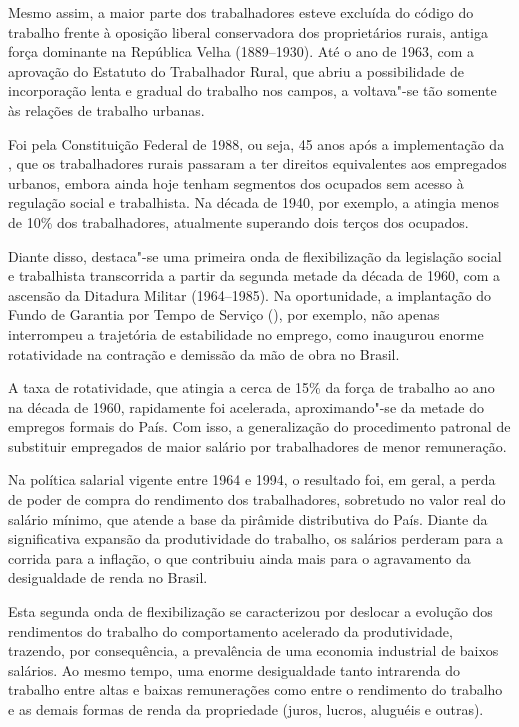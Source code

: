 Mesmo assim, a maior parte dos trabalhadores esteve excluída do código
do trabalho frente à oposição liberal conservadora dos proprietários
rurais, antiga força dominante na República Velha (1889--1930). Até o
ano de 1963, com a aprovação do Estatuto do Trabalhador Rural, que abriu
a possibilidade de incorporação lenta e gradual do trabalho nos campos, a 
voltava"-se tão somente às relações de trabalho urbanas.

Foi pela Constituição Federal de 1988, ou seja, 45 anos após a implementação
da , que os trabalhadores rurais passaram a ter direitos equivalentes
aos empregados urbanos, embora ainda hoje tenham segmentos dos ocupados
sem acesso à regulação social e trabalhista. Na década de 1940, por
exemplo, a  atingia menos de 10\% dos trabalhadores, atualmente
superando dois terços dos ocupados.

Diante disso, destaca"-se uma primeira onda de flexibilização da
legislação social e trabalhista transcorrida a partir da segunda metade
da década de 1960, com a ascensão da Ditadura Militar (1964--1985). Na
oportunidade, a implantação do Fundo de Garantia por Tempo de Serviço
(), por exemplo, não apenas interrompeu a trajetória de estabilidade
no emprego, como inaugurou enorme rotatividade na contração e demissão
da mão de obra no Brasil.

A taxa de rotatividade, que atingia a cerca de 15\% da força de trabalho
ao ano na década de 1960, rapidamente foi acelerada, aproximando"-se da
metade do empregos formais do País. Com isso, a generalização do
procedimento patronal de substituir empregados de maior salário por
trabalhadores de menor remuneração.

Na política salarial vigente entre 1964 e 1994, o resultado foi, em
geral, a perda de poder de compra do rendimento dos trabalhadores,
sobretudo no valor real do salário mínimo, que atende a base da pirâmide
distributiva do País. Diante da significativa expansão da produtividade
do trabalho, os salários perderam para a corrida para a inflação, o que
contribuiu ainda mais para o agravamento da desigualdade de renda no
Brasil.

Esta segunda onda de flexibilização se caracterizou por deslocar a
evolução dos rendimentos do trabalho do comportamento acelerado da
produtividade, trazendo, por consequência, a prevalência de uma economia
industrial de baixos salários. Ao mesmo tempo, uma enorme desigualdade
tanto intrarenda do trabalho entre altas e baixas remunerações como
entre o rendimento do trabalho e as demais formas de renda da
propriedade (juros, lucros, aluguéis e outras).

